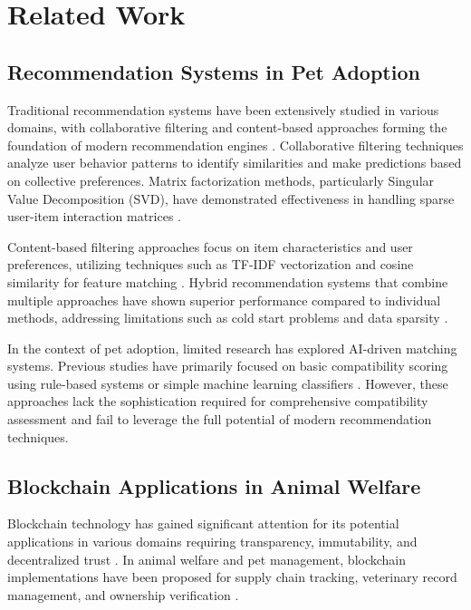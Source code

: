 \documentclass[conference]{IEEEtran}
\begin{document}
\section{Related Work}

\subsection{Recommendation Systems in Pet Adoption}

Traditional recommendation systems have been extensively studied in various domains, with collaborative filtering and content-based approaches forming the foundation of modern recommendation engines \cite{recommender2023}. Collaborative filtering techniques analyze user behavior patterns to identify similarities and make predictions based on collective preferences. Matrix factorization methods, particularly Singular Value Decomposition (SVD), have demonstrated effectiveness in handling sparse user-item interaction matrices \cite{matrixfactor2022}.

Content-based filtering approaches focus on item characteristics and user preferences, utilizing techniques such as TF-IDF vectorization and cosine similarity for feature matching \cite{contentbased2023}. Hybrid recommendation systems that combine multiple approaches have shown superior performance compared to individual methods, addressing limitations such as cold start problems and data sparsity \cite{hybrid2024}.

In the context of pet adoption, limited research has explored AI-driven matching systems. Previous studies have primarily focused on basic compatibility scoring using rule-based systems or simple machine learning classifiers \cite{petmatching2022}. However, these approaches lack the sophistication required for comprehensive compatibility assessment and fail to leverage the full potential of modern recommendation techniques.

\subsection{Blockchain Applications in Animal Welfare}

Blockchain technology has gained significant attention for its potential applications in various domains requiring transparency, immutability, and decentralized trust \cite{blockchain2023}. In animal welfare and pet management, blockchain implementations have been proposed for supply chain tracking, veterinary record management, and ownership verification \cite{animalblock2024}.
\end{document}

